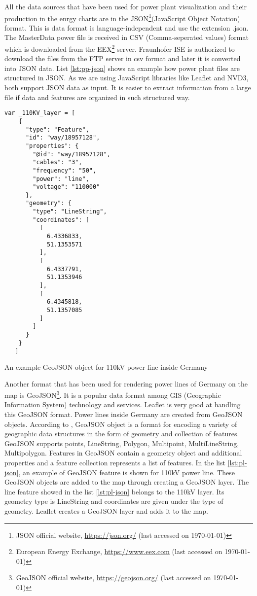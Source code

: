 All the data sources that have been used for power plant visualization and their production in the enrgy charts are in the JSON\footnote{JSON official website, \url{https://json.org/} (last accessed on {\today})}(JavaScript Object Notation) format. This is data format is language-independent and use the extension .json. The MasterData power file is received in CSV (Comma-seperated values) format which is downloaded from the EEX\footnote{European Energy Exchange, \url{https://www.eex.com} (last accessed on {\today})} server. Fraunhofer ISE is authorized to download the files from the FTP server in csv format and later it is converted into JSON data. List \ref{lst:pp-json} shows an example how power plant files are structured in JSON. As we are using JavaScript libraries like Leaflet and NVD3, both support JSON data as input. It is easier to extract information from a large file if data and features are organized in such structured way. 

\begin{Listing}
\begin{lstlisting}
var _110KV_layer = [
    {
      "type": "Feature",
      "id": "way/18957128",
      "properties": {
        "@id": "way/18957128",
        "cables": "3",
        "frequency": "50",
        "power": "line",
        "voltage": "110000"
      },
      "geometry": {
        "type": "LineString",
        "coordinates": [
          [
            6.4336833,
            51.1353571
          ],
          [
            6.4337791,
            51.1353946
          ],
          [
            6.4345818,
            51.1357085
          ]
        ]
      }
    }
   ]
\end{lstlisting}
\caption{An example GeoJSON-object for 110kV power line inside Germany}
\label{lst:pl-json}
\end{Listing}

Another format that has been used for rendering power lines of Germany on the map is GeoJSON\footnote{GeoJSON official website, \url{https://geojson.org/} (last accessed on {\today})}. It is a popular data format among GIS (Geographic Information System) technology and services. Leaflet is very good at handling this GeoJSON format. Power lines inside Germany are created from GeoJSON objects. According to \cite{geojson16}, GeoJSON object is a format for encoding a variety of geographic data structures in the form of geometry and collection of features. GeoJSON supports points, LineString, Polygon, Multipoint, MultiLineString, Multipolygon. Features in GeoJSON contain a geometry object and additional properties and a feature collection represents a list of features. In the list \ref{lst:pl-json}, an example of GeoJSON feature is shown for 110kV power line. These GeoJSON objects are added to the map through creating a GeoJSON layer. The line feature showed in the list \ref{lst:pl-json} belongs to the 110kV layer. Its geometry type is LineString and coordinates are given under the type of geometry. Leaflet creates a GeoJSON layer and adds it to the map.


